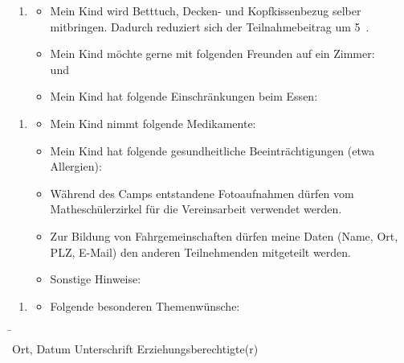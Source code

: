 \documentclass[13pt]{zettel}
\newenvironment{themabox}[1]{%
  \vspace{-0.8em}%
  \begin{enumerate}[labelindent=0pt,labelwidth=2.35cm,itemindent=0em,leftmargin=!,align=left]
    \item[\textbf{#1}]
      \begin{itemize}
}{\end{itemize}\end{enumerate}\vspace{-0.3em}}
\begin{document}
\begin{shaded}\begin{themabox}{Unterkunft}
\item Mein Kind wird Betttuch, Decken- und Kopfkissenbezug selber mitbringen.
Dadurch reduziert sich der Teilnahmebeitrag um 5~\texteuro{}.
\item Mein Kind möchte gerne mit folgenden Freunden auf ein Zimmer: \\[1em] \freistMittel \quad und \quad \freistMittel
\item Mein Kind hat folgende Einschränkungen beim Essen: \\[1em]
\freist{13cm}
\end{themabox}\end{shaded}
\vspace{-0.5cm}

\begin{shaded}\begin{themabox}{Sonstiges}
\item Mein Kind nimmt folgende Medikamente:
\freist{5.4cm}
\item Mein Kind hat folgende gesundheitliche Beeinträchtigungen
(etwa Allergien): \\[1em] \freist{13cm}
\item Während des Camps entstandene Fotoaufnahmen dürfen
vom Matheschülerzirkel für die Vereinsarbeit verwendet werden.
\item Zur Bildung von Fahrgemeinschaften dürfen meine Daten (Name, Ort, PLZ,
E-Mail) den anderen Teilnehmenden mitgeteilt werden.
\item Sonstige Hinweise: \freist{10cm}
\end{themabox}
\end{shaded}
\vspace{-0.5cm}

\begin{shaded}\begin{themabox}{Mathe}
\item[] Folgende besonderen Themenwünsche:
\freist{6.85cm}
\end{themabox}
\end{shaded}

\begin{tabbing}
\freistMittel \qquad\qquad \= \kill
\freistMittel \> \freistLaenger \\
Ort, Datum \> Unterschrift Erziehungsberechtigte(r)
\end{tabbing}
\end{document}
